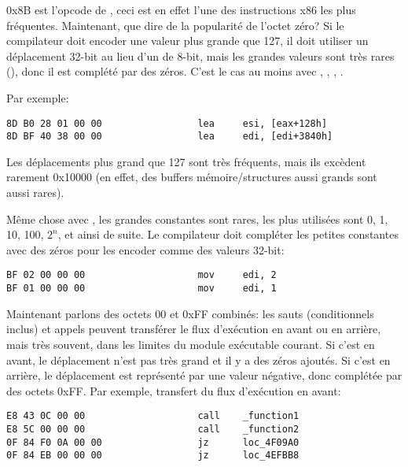 0x8B est l'opcode de , ceci est en effet l'une des instructions x86 les
plus fréquentes.
Maintenant, que dire de la popularité de l'octet zéro?
Si le compilateur doit encoder une valeur plus grande que 127, il doit utiliser un
déplacement 32-bit au lieu d'un de 8-bit, mais les grandes valeurs sont très rares (),
donc il est complété par des zéros.
C'est le cas au moins avec , , , .

Par exemple:

\begin{lstlisting}[style=customasmx86]
8D B0 28 01 00 00                 lea     esi, [eax+128h]
8D BF 40 38 00 00                 lea     edi, [edi+3840h]
\end{lstlisting}

Les déplacements plus grand que 127 sont très fréquents, mais ils excèdent rarement
0x10000 (en effet, des buffers mémoire/structures aussi grands sont aussi rares).

Même chose avec , les grandes constantes sont rares, les plus utilisées sont
0, 1, 10, 100, $2^n$, et ainsi de suite.
Le compilateur doit compléter les petites constantes avec des zéros pour les encoder
comme des valeurs 32-bit:

\begin{lstlisting}[style=customasmx86]
BF 02 00 00 00                    mov     edi, 2
BF 01 00 00 00                    mov     edi, 1
\end{lstlisting}

Maintenant parlons des octets 00 et 0xFF combinés: les sauts (conditionnels inclus)
et appels peuvent transférer le flux d'exécution en avant ou en arrière, mais très
souvent, dans les limites du module exécutable courant.
Si c'est en avant, le déplacement n'est pas très grand et il y a des zéros ajoutés.
Si c'est en arrière, le déplacement est représenté par une valeur négative, donc
complétée par des octets 0xFF.
Par exemple, transfert du flux d'exécution en avant:

\begin{lstlisting}[style=customasmx86]
E8 43 0C 00 00                    call    _function1
E8 5C 00 00 00                    call    _function2
0F 84 F0 0A 00 00                 jz      loc_4F09A0
0F 84 EB 00 00 00                 jz      loc_4EFBB8
\end{lstlisting}

